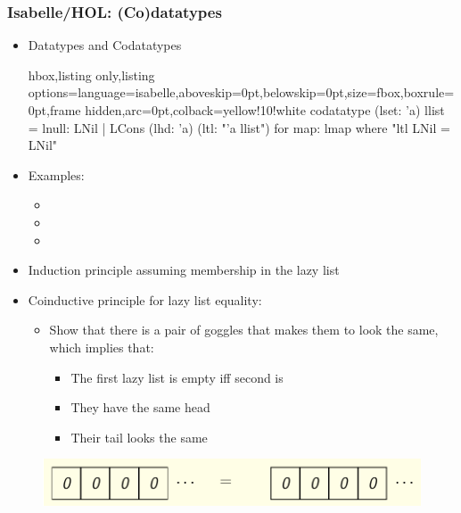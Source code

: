 \documentclass[aspectratio=169,10pt]{beamer}
\begin{document}
\begin{frame}
  \frametitle{Isabelle/HOL: (Co)datatypes}
  \begin{itemize}
    \item Datatypes and Codatatypes
\vspace*{-1ex}
          \begin{tcblisting}{hbox,listing only,listing options={language=isabelle,aboveskip=0pt,belowskip=0pt},size=fbox,boxrule=0pt,frame hidden,arc=0pt,colback=yellow!10!white}
codatatype (lset: 'a) llist = lnull: LNil | LCons (lhd: 'a) (ltl: "'a llist")
  for map: lmap where "ltl LNil = LNil"
          \end{tcblisting}
\vspace*{-1ex}
    \item Examples:
          \begin{itemize}
            \item {}
            \item {}
            \item {}
          \end{itemize}
\vspace*{-1ex}
    \item Induction principle assuming membership in the lazy list
    \item Coinductive principle for lazy list equality:
          \begin{itemize}
            \item Show that there is a pair of goggles that makes them to look the same, which implies that:
                  \begin{itemize}
                    \item The first lazy list is empty iff second is
                    \item They have the same head
                    \item Their tail looks the same
                  \end{itemize}
          \end{itemize}
  \end{itemize}
\vspace*{-1ex}
\begin{overlayarea}{\textwidth}{.45\textheight}
  \begin{figure}
    \centering
    \includegraphics[scale=0.4]{equality.png}
  \end{figure}
\end{overlayarea}
\end{frame}
\end{document}
